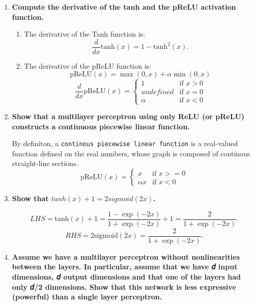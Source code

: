 \documentclass[11pt]{article}
\providecommand{\tightlist}{%
      \setlength{\itemsep}{0pt}\setlength{\parskip}{0pt}}
\begin{document}
\begin{enumerate}
\def\labelenumi{\arabic{enumi}.}
\item
  \textbf{Compute the derivative of the tanh and the pReLU activation
  function.}

  \begin{enumerate}
  \def\labelenumii{\alph{enumii}.}
  \tightlist
  \item
    The derivative of the Tanh function is:
    \[\frac{d}{dx} \mathrm{tanh}(x) = 1 - \mathrm{tanh}^2(x).\]
  \item
    The derivative of the pReLU function is:\\
    \[\mathrm{pReLU}(x) = \max(0, x) + \alpha \min(0, x)\]
    \[\begin{equation}
      \frac{d}{dx} \mathrm{pReLU}(x) =
            \begin{cases}
              1 & \text{if $x > 0$}\\
              undefined & \text{if $x = 0$}\\
              \alpha & \text{if $x < 0$}
            \end{cases}       
    \end{equation}\]
  \end{enumerate}
\item
  \textbf{Show that a multilayer perceptron using only ReLU (or pReLU)
  constructs a continuous piecewise linear function.}

  By definiton, a \texttt{continous\ piecewise\ linear\ function} is a
  real-valued function defined on the real numbers, whose graph is
  composed of continous straight-line sections. \[\begin{equation}
    \mathrm{pReLU}(x) =
          \begin{cases}
            x & \text{if $x >= 0$}\\
            \alpha x & \text{if $x < 0$}
          \end{cases}       
  \end{equation}\]
\item
  \textbf{Show that \(tanh(𝑥)+1=2sigmoid(2𝑥)\).}

  \[ LHS = \text{tanh}(x)+1 = \frac{1 - \exp(-2x)}{1 + \exp(-2x)} + 1
                  =\frac{2}{1 + \exp(-2x)} .\]
  \[ RHS = 2 \mathrm{sigmoid}(2x) = \frac{2}{1 + \exp(-2x)}.\]
\item
  \textbf{Assume we have a multilayer perceptron without nonlinearities
  between the layers. In particular, assume that we have 𝑑 input
  dimensions, 𝑑 output dimensions and that one of the layers had only
  𝑑/2 dimensions. Show that this network is less expressive (powerful)
  than a single layer perceptron.}


\end{enumerate}
\end{document}
